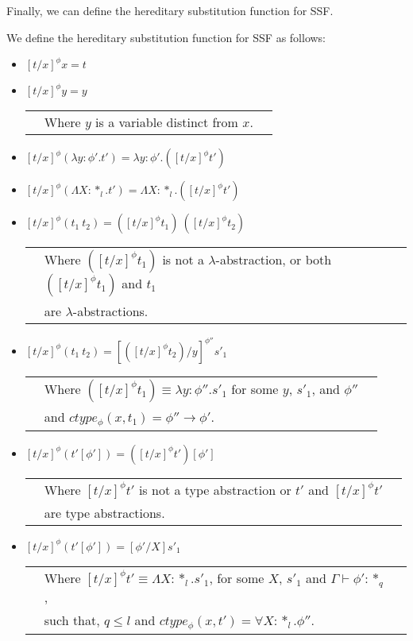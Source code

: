 \noindent
Finally, we can define the hereditary substitution function for SSF.
\begin{definition}
  \label{def:hereditary_substitution_ssf}
  We define the hereditary substitution function for SSF as follows:
  \begin{itemize}
  \item[] $[t/x]^\phi x = t$
  \item[] $[t/x]^\phi y = y$\\
    \begin{tabular}{lll}
      & Where $y$ is a variable distinct from $x$.\\
    \end{tabular}
  \item[] $[t/x]^\phi (\lambda y:\phi'.t') = \lambda y:\phi'.([t/x]^\phi t')$
  \item[] $[t/x]^\phi (\Lambda X:*_l.t') = \Lambda X:*_l.([t/x]^\phi t')$
  \item[] $[t/x]^\phi (t_1\ t_2) = ([t/x]^\phi t_1)\ ([t/x]^\phi t_2)$\\
    \begin{tabular}{lll}
      & Where $([t/x]^\phi t_1)$ is not a $\lambda$-abstraction, or both $([t/x]^\phi t_1)$ and $t_1$\\
      & are $\lambda$-abstractions.
    \end{tabular}
  \item[] $[t/x]^{\phi} (t_1\ t_2) = [([t/x]^{\phi} t_2)/y]^{\phi''} s'_1$\\
    \begin{tabular}{lll}
      & Where $([t/x]^{\phi} t_1) \equiv \lambda y:\phi''.s'_1$ for some $y$, $s'_1$, and $\phi''$ \\
      & and $ctype_\phi(x,t_1) = \phi'' \to \phi'$.
    \end{tabular}
  \item[] $[t/x]^\phi (t'[\phi']) = ([t/x]^\phi t')[\phi']$\\
    \begin{tabular}{lll}
      & Where $[t/x]^\phi t'$ is not a type abstraction or $t'$ and $[t/x]^\phi t'$ \\
      & are type abstractions.
    \end{tabular}
    \item[] $[t/x]^{\phi} (t'[\phi']) = [\phi'/X]s'_1$\\
      \begin{tabular}{lll}
        & Where $[t/x]^{\phi} t' \equiv \Lambda X:*_l.s'_1$, for some $X$, $s'_1$ and $\Gamma \vdash \phi':*_q$, \\
        & such that, $q \leq l$ and $ctype_\phi(x,t') = \forall X:*_l.\phi''$.
      \end{tabular}
  \end{itemize}
\end{definition}

